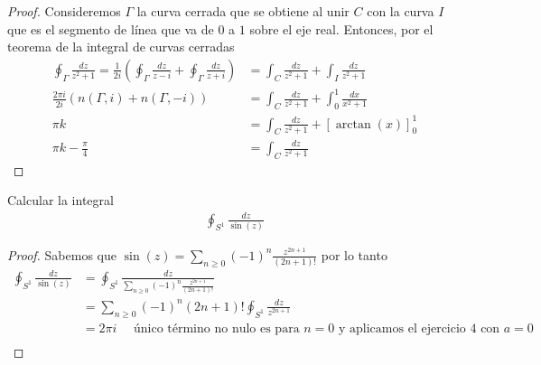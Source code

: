 \documentclass{article}
\newenvironment{theorem}[2][Ejercicio]{\begin{trivlist}
\item[\hskip\labelsep{\bfseries #1}\hskip\labelsep{\bfseries #2.}]}{\end{trivlist}}
\begin{document}
\begin{proof}
    Consideremos \( \Gamma \) la curva cerrada que se obtiene al unir \( C \) con la curva \( I \) que es el segmento de línea que va de \( 0 \) a \( 1 \) sobre el eje real.
    Entonces, por el teorema de la integral de curvas cerradas \begin{align*}
        \oint_{\Gamma} \frac{dz}{z^2 + 1} = \frac{1}{2i} \left(\oint_{\Gamma} \frac{dz}{z-i} + \oint_{\Gamma} \frac{dz}{z+i} \right) & = \int_C \frac{dz}{z^2 + 1} + \int_I \frac{dz}{z^2 + 1}       \\
        \frac{2\pi i}{2i} \left( n(\Gamma, i) + n(\Gamma, -i) \right)                                                                & = \int_C \frac{dz}{z^2 + 1} + \int_0^1 \frac{dx}{x^2 + 1}     \\
        \pi k                                                                                                                        & = \int_C \frac{dz}{z^2 + 1} + {\left[ \arctan(x) \right]}_0^1 \\
        \pi k - \frac{\pi}{4}                                                                                                        & = \int_C \frac{dz}{z^2 + 1}
    \end{align*}
\end{proof}

\vspace{0.25in}

\begin{theorem}{8}
    Calcular la integral \begin{align*}
        \oint_{S^1} \frac{dz}{\sin(z)}
    \end{align*}
\end{theorem}

\begin{proof}
    Sabemos que \( \sin(z) = \sum_{n \geq 0} {(-1)}^n \frac{z^{2n+1}}{(2n+1)!} \) por lo tanto \begin{align*}
        \oint_{S^1} \frac{dz}{\sin(z)} & = \oint_{S^1} \frac{dz}{\sum_{n \geq 0} {(-1)}^n \frac{z^{2n+1}}{(2n+1)!}}                                \\
                                       & = \sum_{n \geq 0} {(-1)}^n (2n+1)! \oint_{S^1} \frac{dz}{z^{2n+1}}                                        \\
                                       & = 2\pi i \quad \text{ único término no nulo es para } n = 0 \text{ y aplicamos el ejercicio 4 con } a = 0 \\
    \end{align*}
\end{proof}
\end{document}
